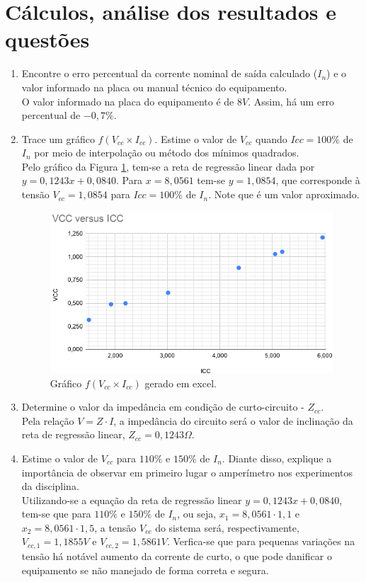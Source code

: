\documentclass[a4paper,12pt,oneside,openany,table,xcdraw]{article}
\begin{document}
\section{Cálculos, análise dos resultados e questões} %
\begin{enumerate}[1)]
\item Encontre o erro percentual da corrente nominal de saída calculado ($I_n$) e o valor informado na placa ou manual técnico do equipamento.\\
O valor informado na placa do equipamento é de $8V$. Assim, há um erro percentual de $-0,7\%$.

\item Trace um gráfico $f(V_{cc}\times I_{cc})$. Estime o valor de $V_{cc}$ quando $Icc=100\%$ de $I_n$ por meio de interpolação ou método dos mínimos quadrados.\\
Pelo gráfico da Figura \ref{graph}, tem-se a reta de regressão linear dada por $y=0,1243x+0,0840$. Para $x=8,0561$ tem-se $y=1,0854$, que corresponde à tensão $V_{cc}=1,0854$ para $Icc=100\%$ de $I_n$. Note que é um valor aproximado.

\begin{figure}[H]
\centering
\captionsetup{font=scriptsize}
\includegraphics[width=14.5cm]{graph}
\caption{Gráfico $f(V_{cc}\times I_{cc})$ gerado em excel.}
\label{graph}
\end{figure}

\item Determine o valor da impedância em condição de curto-circuito - $Z_{cc}$.\\
Pela relação $V=Z\cdot I$, a impedância do circuito será o valor de inclinação da reta de regressão linear, $Z_{cc}=0,1243\Omega$.

\item Estime o valor de $V_{cc}$ para $110\%$ e $150\%$ de $I_n$. Diante disso, explique a importância de observar em primeiro lugar o amperímetro nos experimentos da disciplina.\\
Utilizando-se a equação da reta de regressão linear $y=0,1243x+0,0840$, tem-se que para $110\%$ e $150\%$ de $I_n$, ou seja, $x_1=8,0561\cdot1,1$ e $x_2=8,0561\cdot1,5$, a tensão $V_{cc}$ do sistema será, respectivamente, $V_{cc, 1}=1,1855 V$ e $V_{cc, 2}=1,5861 V$. Verfica-se que para pequenas variações na tensão há notável aumento da corrente de curto, o que pode danificar o equipamento se não manejado de forma correta e segura. 


\end{enumerate}
\end{document}

